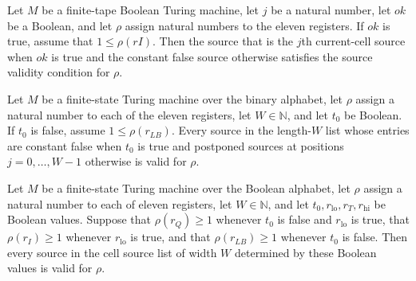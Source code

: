 \begin{theorem}
\label{Complexity.UTab.ok_chS}
\leanok
{}
Let $M$ be a finite-tape Boolean Turing machine, let $j$ be a natural number, let $ok$
be a Boolean, and let $\rho$ assign natural numbers to the eleven registers. If $ok$ is
true, assume that $1 \leq \rho(rI)$. Then the source that is the $j$th current-cell
source when $ok$ is true and the constant false source otherwise satisfies the source
validity condition for $\rho$.
\end{theorem}

\begin{theorem}
\label{Complexity.UTab.ok_psnS}
\leanok
{}
Let $M$ be a finite-state Turing machine over the binary alphabet, let $\rho$ assign a
natural number to each of the eleven registers, let $W\in\mathbb N$, and let $t_0$ be
Boolean. If $t_0$ is false, assume $1\leq\rho(r_{LB})$. Every source in the length-$W$
list whose entries are constant false when $t_0$ is true and postponed sources at
positions $j=0,\ldots,W-1$ otherwise is valid for $\rho$.
\end{theorem}

\begin{theorem}
\label{Complexity.UTab.ok_cellS}
\leanok
{}
Let $M$ be a finite-state Turing machine over the Boolean alphabet, let $\rho$ assign a
natural number to each of eleven registers, let $W\in\mathbb{N}$, and let
$t_0,r_{\mathrm{lo}},r_T,r_{\mathrm{hi}}$ be Boolean values. Suppose that
$\rho(r_Q)\ge1$ whenever $t_0$ is false and $r_{\mathrm{lo}}$ is true, that
$\rho(r_I)\ge1$ whenever $r_{\mathrm{lo}}$ is true, and that $\rho(r_{LB})\ge1$ whenever
$t_0$ is false. Then every source in the cell source list of width $W$ determined by
these Boolean values is valid for $\rho$.
\end{theorem}

